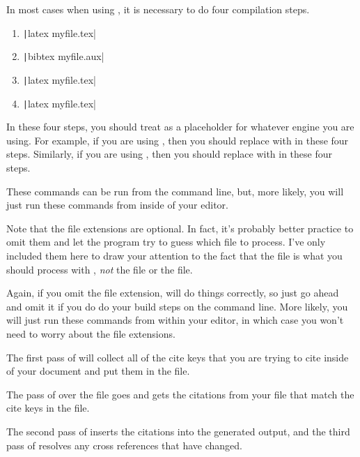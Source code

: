 In most cases when using , it is necessary to do four compilation steps.

\begin{enumerate}[label={(\roman*)}]

	\item{\texttt|latex myfile.tex|}

	\item{\texttt|bibtex myfile.aux|}

	\item{\texttt|latex myfile.tex|}

	\item{\texttt|latex myfile.tex|}

\end{enumerate}

In these four steps, you should treat  as a placeholder for whatever engine you are using.
For example, if you are using , then you should replace  with  in these four steps.
Similarly, if you are using , then you should replace  with  in these four steps.

These commands can be run from the command line, but, more likely, you will just run these commands from inside of your editor.

Note that the file extensions are optional.
In fact, it's probably better practice to omit them and let the program try to guess which file to process.
I've only included them here to draw your attention to the fact that the  file is what you should process with , \emph{not} the  file or the  file.

Again, if you omit the  file extension,  will do things correctly, so just go ahead and omit it if you do do your build steps on the command line.
More likely, you will just run these commands from within your editor, in which case you won't need to worry about the file extensions.

The first pass of  will collect all of the cite keys that you are trying to cite inside of your  document and put them in the  file.

The pass of  over the  file goes and gets the citations from your  file that match the cite keys in the  file.

The second pass of  inserts the citations into the generated output, and the third pass of  resolves any cross references that have changed.

